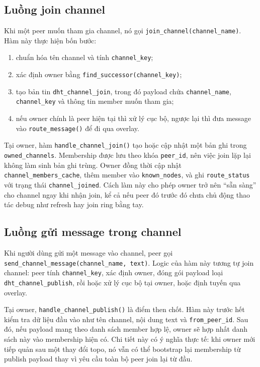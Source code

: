 \subsection{Luồng join channel}
Khi một peer muốn tham gia channel, nó gọi \texttt{join\_channel(channel\_name)}. Hàm này thực hiện bốn bước:
\begin{enumerate}[leftmargin=2em]
    \item chuẩn hóa tên channel và tính \texttt{channel\_key};
    \item xác định owner bằng \texttt{find\_successor(channel\_key)};
    \item tạo bản tin \texttt{dht\_channel\_join}, trong đó payload chứa \texttt{channel\_name}, \texttt{channel\_key} và thông tin member muốn tham gia;
    \item nếu owner chính là peer hiện tại thì xử lý cục bộ, ngược lại thì đưa message vào \texttt{route\_message()} để đi qua overlay.
\end{enumerate}

Tại owner, hàm \texttt{handle\_channel\_join()} tạo hoặc cập nhật một bản ghi trong \texttt{owned\_channels}. Membership được lưu theo khóa \texttt{peer\_id}, nên việc join lặp lại không làm sinh bản ghi trùng. Owner đồng thời cập nhật \texttt{channel\_members\_cache}, thêm member vào \texttt{known\_nodes}, và ghi \texttt{route\_status} với trạng thái \texttt{channel\_joined}. Cách làm này cho phép owner trở nên ``sẵn sàng'' cho channel ngay khi nhận join, kể cả nếu peer đó trước đó chưa chủ động thao tác debug như refresh hay join ring bằng tay.

\subsection{Luồng gửi message trong channel}
Khi người dùng gửi một message vào channel, peer gọi \texttt{send\_channel\_message(channel\_name, text)}. Logic của hàm này tương tự join channel: peer tính \texttt{channel\_key}, xác định owner, đóng gói payload loại \texttt{dht\_channel\_publish}, rồi hoặc xử lý cục bộ tại owner, hoặc định tuyến qua overlay.

Tại owner, \texttt{handle\_channel\_publish()} là điểm then chốt. Hàm này trước hết kiểm tra dữ liệu đầu vào như tên channel, nội dung text và \texttt{from\_peer\_id}. Sau đó, nếu payload mang theo danh sách member hợp lệ, owner sẽ hợp nhất danh sách này vào membership hiện có. Chi tiết này có ý nghĩa thực tế: khi owner mới tiếp quản sau một thay đổi topo, nó vẫn có thể bootstrap lại membership từ publish payload thay vì yêu cầu toàn bộ peer join lại từ đầu.


